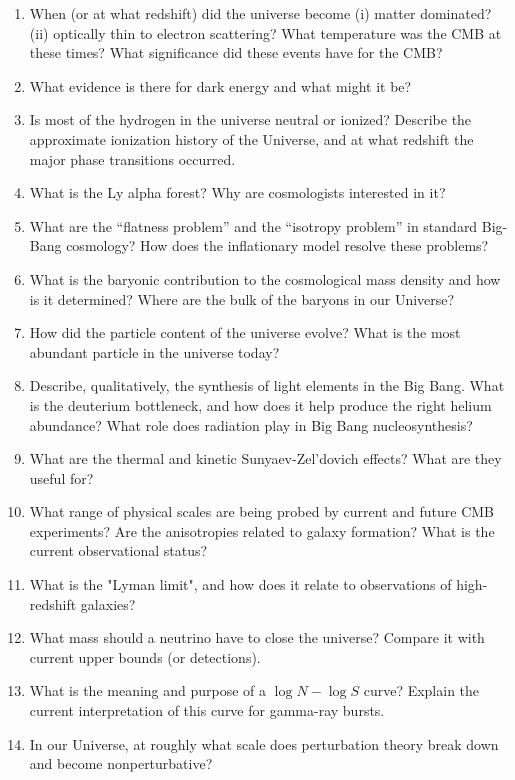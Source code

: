 \documentclass[10pt, oneside]{book}
\begin{document}
\begin{enumerate}[start=126]
    \item When (or at what redshift) did the universe become (i) matter dominated? (ii) optically thin to electron scattering? What temperature was the CMB at these times? What significance did these events have for the CMB?
    \item What evidence is there for dark energy and what might it be?
    \item Is most of the hydrogen in the universe neutral or ionized? Describe the approximate ionization history of the Universe, and at what redshift the major phase transitions occurred.
    \item What is the Ly alpha forest? Why are cosmologists interested in it?
    \item What are the ``flatness problem'' and the ``isotropy problem'' in standard Big-Bang cosmology? How does the inflationary model resolve these problems?
    \item What is the baryonic contribution to the cosmological mass density and how is it determined? Where are the bulk of the baryons in our Universe?
    \item How did the particle content of the universe evolve? What is the most abundant particle in the universe today?
    \item Describe, qualitatively, the synthesis of light elements in the Big Bang. What is the deuterium bottleneck, and how does it help produce the right helium abundance? What role does radiation play in Big Bang nucleosynthesis?
    \item What are the thermal and kinetic Sunyaev-Zel'dovich effects? What are they useful for?
    \item What range of physical scales are being probed by current and future CMB experiments? Are the anisotropies related to galaxy formation? What is the current observational status?
    \item What is the "Lyman limit", and how does it relate to observations of high-redshift galaxies?
    \item What mass should a neutrino have to close the universe? Compare it with current upper bounds (or detections).
    \item What is the meaning and purpose of a $\log N - \log S$ curve? Explain the current interpretation of this curve for gamma-ray bursts.
    \item In our Universe, at roughly what scale does perturbation theory break down and become nonperturbative?
\end{enumerate}
\end{document}
